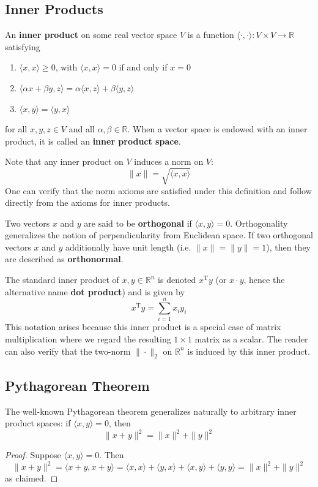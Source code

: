 \documentclass{article}
\newcommand{\R}{\mathbb{R}}
\newcommand{\tran}{^\text{T}}
\newcommand{\inner}[2]{\langle #1, #2 \rangle}
\newcommand{\term}[1]{\textbf{#1}}
\begin{document}
\subsection{Inner Products}
An \term{inner product} on some real vector space $V$ is a function $\inner{\cdot}{\cdot} : V \times V \to \R$ satisfying
\begin{enumerate}
\item $\inner{x}{x} \geq 0$, with $\inner{x}{x} = 0$ if and only if $x = 0$
\item $\inner{\alpha x + \beta y}{z} = \alpha\inner{x}{z} + \beta\inner{y}{z}$
\item $\inner{x}{y} = \inner{y}{x}$
\end{enumerate}
for all $x,y,z \in V$ and all $\alpha,\beta \in \R$. When a vector space is endowed with an inner product, it is called an \term{inner product space}.

Note that any inner product on $V$ induces a norm on $V$:
\[\|x\| = \sqrt{\inner{x}{x}}\]
One can verify that the norm axioms are satisfied under this definition and follow directly from the axioms for inner products. 

Two vectors $x$ and $y$ are said to be \term{orthogonal} if $\inner{x}{y} = 0$. Orthogonality generalizes the notion of perpendicularity from Euclidean space. If two orthogonal vectors $x$ and $y$ additionally have unit length (i.e. $\|x\| = \|y\| = 1$), then they are described as \term{orthonormal}.

The standard inner product of $x, y \in \R^n$ is denoted $x\tran y$ (or $x \cdot y$, hence the alternative name \term{dot product}) and is given by
\[x\tran y = \sum_{i=1}^n x_iy_i\]
This notation arises because this inner product is a special case of matrix multiplication where we regard the resulting $1 \times 1$ matrix as a scalar. The reader can also verify that the two-norm $\|\cdot\|_2$ on $\R^n$ is induced by this inner product.

\subsection{Pythagorean Theorem}
The well-known Pythagorean theorem generalizes naturally to arbitrary inner product spaces: if $\inner{x}{y} = 0$, then
\[\|x+y\|^2 = \|x\|^2 + \|y\|^2\]
\begin{proof}
Suppose $\inner{x}{y} = 0$. Then
\[\|x+y\|^2 = \inner{x+y}{x+y} = \inner{x}{x} + \inner{y}{x} + \inner{x}{y} + \inner{y}{y} = \|x\|^2 + \|y\|^2\]
as claimed.
\end{proof}
\end{document}
